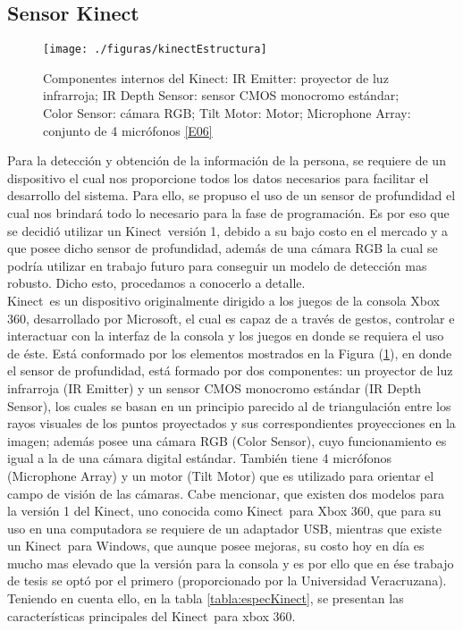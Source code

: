 \documentclass[a4paper,openright,12pt]{report}
\begin{document}
\subsection{Sensor Kinect}
\begin{figure}[thb]
	\centering
	\texttt{[image: ./figuras/kinectEstructura]}
	\caption[Componentes internos del Kinect\textcopyright ]{Componentes internos del Kinect\textcopyright: IR Emitter: proyector de luz infrarroja; IR Depth Sensor: sensor CMOS monocromo estándar; Color Sensor: cámara RGB; Tilt Motor: Motor; Microphone Array: conjunto de 4 micrófonos \hyperlink{e06}{[E06]}} \label{fig:kinectEstructura}
\end{figure}
Para la detección y obtención de la información de la persona, se requiere de un dispositivo el cual nos proporcione todos los datos necesarios para facilitar el desarrollo del sistema. Para ello, se propuso el uso de un sensor de profundidad el cual nos brindará todo lo necesario para la fase de programación. Es por eso que se decidió utilizar un Kinect\textcopyright\ versión 1, debido a su bajo costo en el mercado y a que posee dicho sensor de profundidad, además de una cámara RGB la cual se podría utilizar en trabajo futuro para conseguir un modelo de detección mas robusto. Dicho esto, procedamos a conocerlo a detalle.\\
Kinect\textcopyright\ es un dispositivo originalmente dirigido a los juegos de la consola Xbox 360\textregistered, desarrollado por Microsoft\textregistered, el cual es capaz de a través de gestos, controlar e interactuar con la interfaz de la consola y los juegos en donde se requiera el uso de éste. Está conformado por los elementos mostrados en la Figura (\ref{fig:kinectEstructura}), en donde el sensor de profundidad, está formado por dos componentes: un proyector de luz infrarroja (IR Emitter) y un sensor CMOS monocromo estándar (IR Depth Sensor), los cuales se basan en un principio parecido al de triangulación entre los rayos visuales de los puntos proyectados y sus correspondientes proyecciones en la imagen; además posee una cámara RGB (Color Sensor), cuyo funcionamiento es igual a la de una cámara digital estándar. También tiene 4 micrófonos (Microphone Array) y un motor (Tilt Motor) que es utilizado para orientar el campo de visión de las cámaras. Cabe mencionar, que existen dos modelos para la versión 1 del Kinect\textcopyright, uno conocida como Kinect\textcopyright\ para Xbox 360, que para su uso en una computadora se requiere de un adaptador USB, mientras que existe un Kinect\textcopyright\ para Windows, que aunque posee mejoras, su costo hoy en día es mucho mas elevado que la versión para la consola y es por ello que en ése trabajo de tesis se optó por el primero (proporcionado por la Universidad Veracruzana). Teniendo en cuenta ello, en la tabla \ref{tabla:especKinect}, se presentan las características principales del Kinect\textcopyright\ para xbox 360.\\
\end{document}
